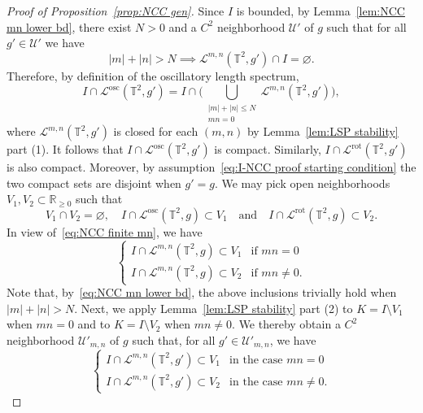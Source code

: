 \documentclass[11pt,letterpaper,oneside]{amsart}
\newcommand{\R}{\mathbb{R}}
\newcommand{\T}{\mathbb{T}}
\theoremstyle{definition}
\theoremstyle{remark}
\theoremstyle{definition}
\theoremstyle{remark}
\newcommand{\CL}{\mathcal{L}}
\newcommand{\CU}{\mathcal{U}}
\DeclareMathOperator{\rot}{rot}
\DeclareMathOperator{\osc}{osc}
\begin{document}
\begin{proof}[Proof of Proposition~\ref{prop:NCC gen}]
    Since $I$ is bounded, by Lemma~\ref{lem:NCC mn lower bd}, there exist $N > 0$ and a $C^2$ neighborhood $\CU'$ of $g$ such that for all $g' \in \CU'$ we have 
    \begin{equation}\label{eq:NCC mn lower bd}
        |m| + |n| > N \implies \CL^{m,n}(\T^2, g') \cap I = \varnothing.
    \end{equation}
    Therefore, by definition of the oscillatory length spectrum,
    \begin{equation}\label{eq:NCC finite mn}
        I \cap \CL^{\osc}(\T^2, g') = I \cap \bigg( \bigcup_{\substack{|m| + |n| \leq N \\ mn = 0}} \CL^{m,n}(\T^2, g') \bigg),
    \end{equation}
    where $\CL^{m,n}(\T^2, g')$ is closed for each $(m,n)$ by Lemma~\ref{lem:LSP stability} part (1). 
    It follows that $I \cap \CL^{\osc}(\T^2, g')$ is compact.
    Similarly, $I \cap \CL^{\rot}(\T^2, g')$ is also compact. 
    Moreover, by assumption~\eqref{eq:I-NCC proof starting condition} the two compact sets are disjoint when $g' = g$.
    We may pick open neighborhoods $V_1, V_2 \subset \R_{\geq 0}$ such that 
    \begin{equation}\label{eq:V12 NCC proof}
        V_1 \cap V_2 = \varnothing, \quad I \cap \CL^{\osc}(\T^2, g) \subset V_1 \quad \text{and} \quad I \cap \CL^{\rot}(\T^2, g) \subset V_2.
    \end{equation}
    In view of~\eqref{eq:NCC finite mn}, we have 
    \begin{equation}
        \begin{cases}
            I \cap \CL^{m,n}(\T^2, g) \subset V_1  & \text{if $mn = 0$}\\
            I \cap \CL^{m,n}(\T^2, g) \subset V_2  & \text{if $mn \neq 0$}.
        \end{cases}
    \end{equation}
    Note that, by~\eqref{eq:NCC mn lower bd}, the above inclusions trivially hold when $|m|+ |n| > N$.
    Next, we apply Lemma~\ref{lem:LSP stability} part (2) to $K = I \setminus V_1$ when $mn = 0$ and to $K = I \setminus V_2$ when $mn \neq 0$. We thereby obtain a $C^2$ neighborhood $\CU'_{m,n}$ of $g$ such that, for all $g' \in \CU'_{m,n}$, we have 
    \begin{equation}\label{eq:NCC perturbed separation}
        \begin{cases}
            I \cap \CL^{m,n}(\T^2, g') \subset V_1 &\text{in the case $mn = 0$}\\
            I \cap \CL^{m,n}(\T^2, g') \subset V_2  &\text{in the case $mn \neq 0$}.

\end{cases}
\end{equation}
\end{proof}
\end{document}
